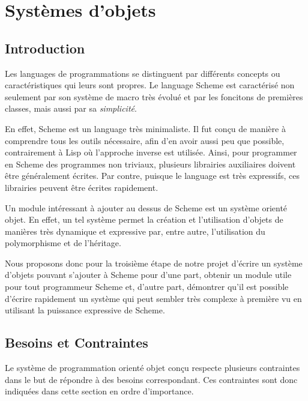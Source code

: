 

\chapter{Systèmes d'objets}

\section{Introduction}

Les languages de programmations se distinguent par différents concepts
ou caractéristiques qui leurs sont propres. Le language Scheme est
caractérisé non seulement par son système de macro très évolué et par
les foncitons de premières classes, mais aussi par sa
\emph{simplicité}.

En effet, Scheme est un language très minimaliste. Il fut conçu de
manière à comprendre tous les outils nécessaire, afin d'en avoir aussi
peu que possible, contrairement à Lisp où l'approche inverse est
utilisée. Ainsi, pour programmer en Scheme des programmes non
triviaux, plusieurs librairies auxiliaires doivent être généralement
écrites. Par contre, puisque le language est très expressifs, ces
librairies peuvent être écrites rapidement.

Un module intéressant à ajouter au dessus de Scheme est un système
orienté objet. En effet, un tel système permet la création et
l'utilisation d'objets de manières très dynamique et expressive par,
entre autre, l'utilisation du polymorphisme et de l'héritage.

Nous proposons donc pour la troisième étape de notre projet d'écrire
un système d'objets pouvant s'ajouter à Scheme pour d'une part,
obtenir un module utile pour tout programmeur Scheme et, d'autre part,
démontrer qu'il est possible d'écrire rapidement un système qui peut
sembler très complexe à première vu en utilisant la puissance
expressive de Scheme.

\clearpage



  \section{Besoins et Contraintes}
    Le système de programmation orienté objet conçu respecte plusieurs
    contraintes dans le but de répondre à des besoins
    correspondant. Ces contraintes sont donc indiquées dans cette
    section en ordre d'importance.

